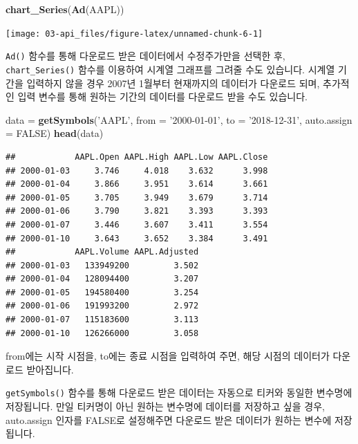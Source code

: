 \documentclass[12pt,]{book}
\newenvironment{Shaded}{\begin{snugshade}}{\end{snugshade}}
\newcommand{\DataTypeTok}[1]{\textcolor[rgb]{0.13,0.29,0.53}{#1}}
\newcommand{\KeywordTok}[1]{\textcolor[rgb]{0.13,0.29,0.53}{\textbf{#1}}}
\newcommand{\NormalTok}[1]{#1}
\newcommand{\OtherTok}[1]{\textcolor[rgb]{0.56,0.35,0.01}{#1}}
\newcommand{\StringTok}[1]{\textcolor[rgb]{0.31,0.60,0.02}{#1}}
\begin{document}
\begin{Shaded}
\begin{Highlighting}[]
\KeywordTok{chart_Series}\NormalTok{(}\KeywordTok{Ad}\NormalTok{(AAPL))}
\end{Highlighting}
\end{Shaded}

\begin{center}\texttt{[image: 03-api\_files/figure-latex/unnamed-chunk-6-1]} \end{center}

\texttt{Ad()} 함수를 통해 다운로드 받은 데이터에서 수정주가만을 선택한 후, \texttt{chart\_Series()} 함수를 이용하여 시계열 그래프를 그려줄 수도 있습니다. 시계열 기간을 입력하지 않을 경우 2007년 1월부터 현재까지의 데이터가 다운로드 되며, 추가적인 입력 변수를 통해 원하는 기간의 데이터를 다운로드 받을 수도 있습니다.

\begin{Shaded}
\begin{Highlighting}[]
\NormalTok{data =}\StringTok{ }\KeywordTok{getSymbols}\NormalTok{(}\StringTok{'AAPL'}\NormalTok{,}
                  \DataTypeTok{from =} \StringTok{'2000-01-01'}\NormalTok{, }\DataTypeTok{to =} \StringTok{'2018-12-31'}\NormalTok{,}
                  \DataTypeTok{auto.assign =} \OtherTok{FALSE}\NormalTok{)}
\KeywordTok{head}\NormalTok{(data)}
\end{Highlighting}
\end{Shaded}

\begin{verbatim}
##            AAPL.Open AAPL.High AAPL.Low AAPL.Close
## 2000-01-03     3.746     4.018    3.632      3.998
## 2000-01-04     3.866     3.951    3.614      3.661
## 2000-01-05     3.705     3.949    3.679      3.714
## 2000-01-06     3.790     3.821    3.393      3.393
## 2000-01-07     3.446     3.607    3.411      3.554
## 2000-01-10     3.643     3.652    3.384      3.491
##            AAPL.Volume AAPL.Adjusted
## 2000-01-03   133949200         3.502
## 2000-01-04   128094400         3.207
## 2000-01-05   194580400         3.254
## 2000-01-06   191993200         2.972
## 2000-01-07   115183600         3.113
## 2000-01-10   126266000         3.058
\end{verbatim}

from에는 시작 시점을, to에는 종료 시점을 입력하여 주면, 해당 시점의 데이터가 다운로드 받아집니다.

\texttt{getSymbols()} 함수를 통해 다운로드 받은 데이터는 자동으로 티커와 동일한 변수명에 저장됩니다. 만일 티커명이 아닌 원하는 변수명에 데이터를 저장하고 싶을 경우, auto.assign 인자를 FALSE로 설정해주면 다운로드 받은 데이터가 원하는 변수에 저장됩니다.
\end{document}
